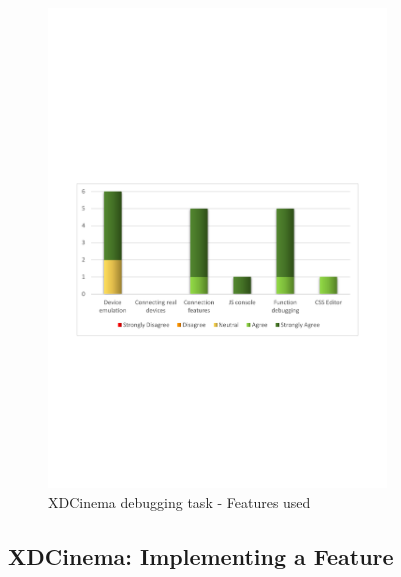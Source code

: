 \begin{figure}[H]
  \centering
    \includegraphics[width=0.8\textwidth]{images/charts/xdc_bug_features_used.pdf}
	\caption{XDCinema debugging task - Features used}
	\label{fig:xdc_bug_features_used}
\end{figure}

\subsection{XDCinema: Implementing a Feature}

